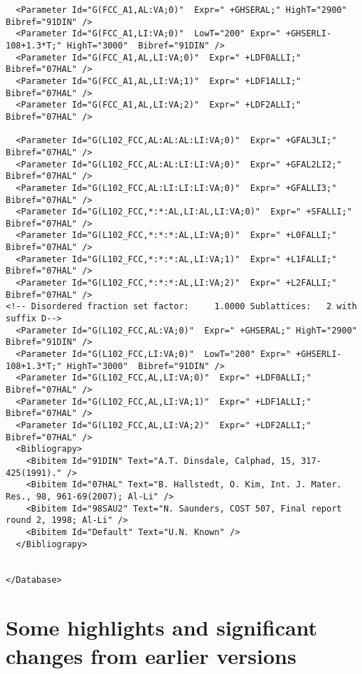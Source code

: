 \documentclass{article}
\begin{document}
\begin{appendices}
\begin{verbatim}
  <Parameter Id="G(FCC_A1,AL:VA;0)"  Expr=" +GHSERAL;" HighT="2900"  Bibref="91DIN" />
  <Parameter Id="G(FCC_A1,LI:VA;0)"  LowT="200" Expr=" +GHSERLI-108+1.3*T;" HighT="3000"  Bibref="91DIN" />
  <Parameter Id="G(FCC_A1,AL,LI:VA;0)"  Expr=" +LDF0ALLI;"  Bibref="07HAL" />
  <Parameter Id="G(FCC_A1,AL,LI:VA;1)"  Expr=" +LDF1ALLI;"  Bibref="07HAL" />
  <Parameter Id="G(FCC_A1,AL,LI:VA;2)"  Expr=" +LDF2ALLI;"  Bibref="07HAL" />

  <Parameter Id="G(L102_FCC,AL:AL:AL:LI:VA;0)"  Expr=" +GFAL3LI;"  Bibref="07HAL" />
  <Parameter Id="G(L102_FCC,AL:AL:LI:LI:VA;0)"  Expr=" +GFAL2LI2;"  Bibref="07HAL" />
  <Parameter Id="G(L102_FCC,AL:LI:LI:LI:VA;0)"  Expr=" +GFALLI3;"  Bibref="07HAL" />
  <Parameter Id="G(L102_FCC,*:*:AL,LI:AL,LI:VA;0)"  Expr=" +SFALLI;"  Bibref="07HAL" />
  <Parameter Id="G(L102_FCC,*:*:*:AL,LI:VA;0)"  Expr=" +L0FALLI;"  Bibref="07HAL" />
  <Parameter Id="G(L102_FCC,*:*:*:AL,LI:VA;1)"  Expr=" +L1FALLI;"  Bibref="07HAL" />
  <Parameter Id="G(L102_FCC,*:*:*:AL,LI:VA;2)"  Expr=" +L2FALLI;"  Bibref="07HAL" />
<!-- Disordered fraction set factor:     1.0000 Sublattices:   2 with suffix D-->
  <Parameter Id="G(L102_FCC,AL:VA;0)"  Expr=" +GHSERAL;" HighT="2900"  Bibref="91DIN" />
  <Parameter Id="G(L102_FCC,LI:VA;0)"  LowT="200" Expr=" +GHSERLI-108+1.3*T;" HighT="3000"  Bibref="91DIN" />
  <Parameter Id="G(L102_FCC,AL,LI:VA;0)"  Expr=" +LDF0ALLI;"  Bibref="07HAL" />
  <Parameter Id="G(L102_FCC,AL,LI:VA;1)"  Expr=" +LDF1ALLI;"  Bibref="07HAL" />
  <Parameter Id="G(L102_FCC,AL,LI:VA;2)"  Expr=" +LDF2ALLI;"  Bibref="07HAL" />
  <Bibliograpy>
    <Bibitem Id="91DIN" Text="A.T. Dinsdale, Calphad, 15, 317-425(1991)." /> 
    <Bibitem Id="07HAL" Text="B. Hallstedt, O. Kim, Int. J. Mater. Res., 98, 961-69(2007); Al-Li" /> 
    <Bibitem Id="98SAU2" Text="N. Saunders, COST 507, Final report round 2, 1998; Al-Li" /> 
    <Bibitem Id="Default" Text="U.N. Known" /> 
  </Bibliograpy>


</Database>
\end{verbatim}

\newpage

\setcounter{equation}{0}
\renewcommand{\theequation}{E\arabic{equation}}
\setcounter{figure}{0}
\renewcommand{\thefigure}{E\arabic{figure}}

\section{Some highlights and significant changes from earlier versions}\label{sec:changes}


\end{appendices}
\end{document}
